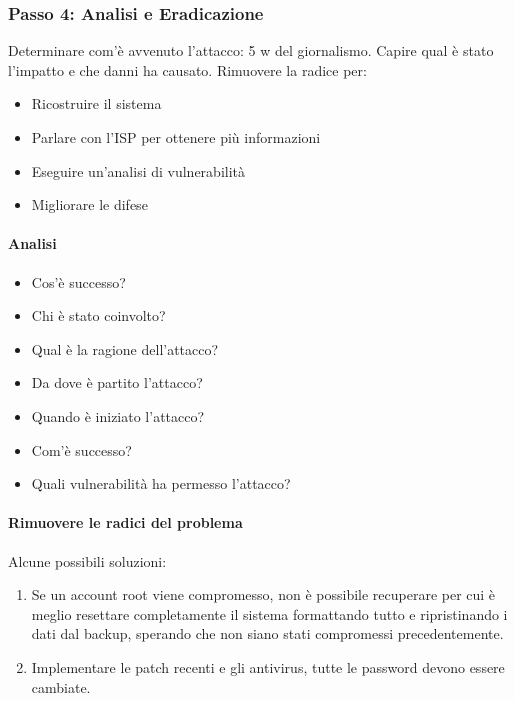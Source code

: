 \subsubsection{Passo 4: Analisi e Eradicazione}

Determinare com'è avvenuto l'attacco: 5 w del giornalismo. Capire qual è stato
l'impatto e che danni ha causato. Rimuovere la radice per:

\begin{itemize}
\item Ricostruire il sistema
\item Parlare con l'ISP per ottenere più informazioni
\item Eseguire un'analisi di vulnerabilità
\item Migliorare le difese 
\end{itemize}


\paragraph*{Analisi}

\begin{itemize}
\item Cos'è successo?
\item Chi è stato coinvolto?
\item Qual è la ragione dell'attacco?
\item Da dove è partito l'attacco?
\item Quando è iniziato l'attacco?
\item Com'è successo?
\item Quali vulnerabilità ha permesso l'attacco?
\end{itemize}


\paragraph*{Rimuovere le radici del problema}

Alcune possibili soluzioni:
\begin{enumerate}
\item Se un account root viene compromesso, non è possibile recuperare per cui è
meglio resettare completamente il sistema formattando tutto e ripristinando i
dati dal backup, sperando che non siano stati compromessi precedentemente.
\item Implementare le patch recenti e gli antivirus, tutte le password devono
essere cambiate.
\end{enumerate}

